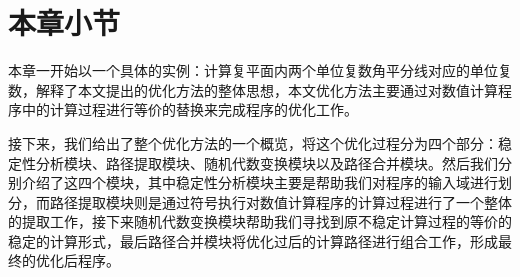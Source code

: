  \section{本章小节}

 本章一开始以一个具体的实例：计算复平面内两个单位复数角平分线对应的单位复数，解释了本文提出的优化方法的整体思想，本文优化方法主要通过对数值计算程序中的计算过程进行等价的替换来完成程序的优化工作。

 接下来，我们给出了整个优化方法的一个概览，将这个优化过程分为四个部分：稳定性分析模块、路径提取模块、随机代数变换模块以及路径合并模块。然后我们分别介绍了这四个模块，其中稳定性分析模块主要是帮助我们对程序的输入域进行划分，而路径提取模块则是通过符号执行对数值计算程序的计算过程进行了一个整体的提取工作，接下来随机代数变换模块帮助我们寻找到原不稳定计算过程的等价的稳定的计算形式，最后路径合并模块将优化过后的计算路径进行组合工作，形成最终的优化后程序。
